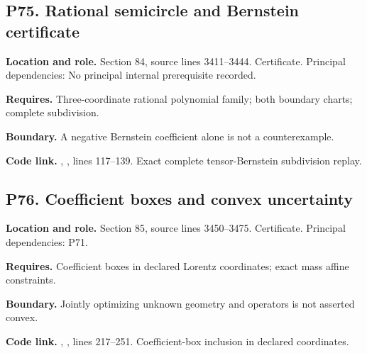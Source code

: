 \documentclass[11pt,letterpaper]{article}
\begin{document}
\par\noindent\begin{minipage}{\textwidth}
\subsection{P75. Rational semicircle and Bernstein
certificate}\label{p75.-rational-semicircle-and-bernstein-certificate}

\textbf{Location and role.} Section 84, source lines 3411--3444.
Certificate. Principal dependencies: No principal internal prerequisite
recorded.

\textbf{Requires.} Three-coordinate rational polynomial family; both
boundary charts; complete subdivision.

\textbf{Boundary.} A negative Bernstein coefficient alone is not a
counterexample.

\textbf{Code link.} ,
, lines 117--139. Exact complete
tensor-Bernstein subdivision replay.
\end{minipage}\par\medskip

\par\noindent\begin{minipage}{\textwidth}
\subsection{P76. Coefficient boxes and convex
uncertainty}\label{p76.-coefficient-boxes-and-convex-uncertainty}

\textbf{Location and role.} Section 85, source lines 3450--3475.
Certificate. Principal dependencies: P71.

\textbf{Requires.} Coefficient boxes in declared Lorentz coordinates;
exact mass affine constraints.

\textbf{Boundary.} Jointly optimizing unknown geometry and operators is
not asserted convex.

\textbf{Code link.} ,
, lines 217--251. Coefficient-box inclusion
in declared coordinates.
\end{minipage}\par\medskip
\end{document}
